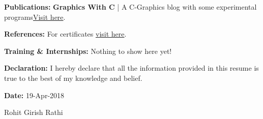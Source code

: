 \documentclass[11pt]{article}
\begin{document}
\begin{center}
\begin{minipage}[t]{0.36\textwidth}
			\raggedright
			\begin{large}
				\textbf{Publications:}\linebreak\linebreak%
				{\small
				\textbf{Graphics With C} | A C-Graphics blog with some experimental programs\linebreak\href{https://graphicswithc.wordpress.com/}{Visit here}.
				}
			\end{large}
		\end{minipage}%
		\begin{minipage}[t]{0.36\textwidth}
			\raggedright
			\begin{large}
				\textbf{References:}\linebreak\linebreak%
				{\small For certificates \href{https://drive.google.com/drive/folders/1bVXVQVaZzT2G5N63C0CRRbV6w13nRL-j?usp=sharing}{visit here}.
				}
			\end{large}
		\end{minipage}%
		\begin{minipage}[t]{0.28\textwidth}
			\raggedright
			\begin{large}
				\textbf{Training \& Internships:}\linebreak\linebreak%
				{\small Nothing to show here yet!}
			\end{large}
		\end{minipage}%
		\linebreak\linebreak\linebreak\linebreak
		\textbf{Declaration:} I hereby declare that all the information provided in this resume is true to the best of my knowledge and belief.\linebreak\linebreak\linebreak
		\begin{minipage}[t]{0.5\textwidth}
			\raggedright
			\textbf{Date:} 19-Apr-2018
		\end{minipage}%
		\begin{minipage}[t]{0.5\textwidth}
			\raggedleft
			Rohit Girish Rathi
		\end{minipage}%
	\end{center}
\end{document}
